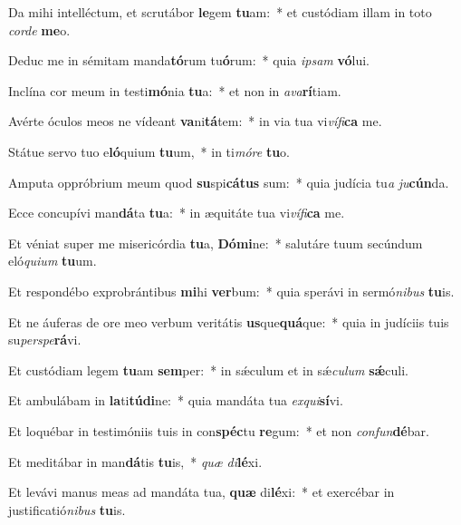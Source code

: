 \item Da mihi intelléctum, et scrutábor \textbf{le}gem \textbf{tu}am:~* et custódiam illam in toto \textit{cor}\textit{de} \textbf{me}o.
\item Deduc me in sémitam manda\textbf{tó}rum tu\textbf{ó}rum:~* quia \textit{ip}\textit{sam} \textbf{vó}lui.
\item Inclína cor meum in testi\textbf{mó}nia \textbf{tu}a:~* et non in \textit{a}\textit{va}\textbf{rí}tiam.
\item Avérte óculos meos ne vídeant \textbf{va}ni\textbf{tá}tem:~* in via tua vi\textit{ví}\textit{fi}\textbf{ca} me.
\item Státue servo tuo e\textbf{ló}quium \textbf{tu}um,~* in ti\textit{mó}\textit{re} \textbf{tu}o.
\item Amputa oppróbrium meum quod \textbf{su}spi\textbf{cá}\textbf{tus} sum:~* quia judícia tu\textit{a} \textit{ju}\textbf{cún}da.
\item Ecce concupívi man\textbf{dá}ta \textbf{tu}a:~* in æquitáte tua vi\textit{ví}\textit{fi}\textbf{ca} me.
\item Et véniat super me misericórdia \textbf{tu}a, \textbf{Dó}\textbf{mi}ne:~* salutáre tuum secúndum eló\textit{qui}\textit{um} \textbf{tu}um.
\item Et respondébo exprobrántibus \textbf{mi}hi \textbf{ver}bum:~* quia sperávi in sermó\textit{ni}\textit{bus} \textbf{tu}is.
\item Et ne áuferas de ore meo verbum veritátis \textbf{us}que\textbf{quá}que:~* quia in judíciis tuis su\textit{per}\textit{spe}\textbf{rá}vi.
\item Et custódiam legem \textbf{tu}am \textbf{sem}per:~* in sǽculum et in sǽ\textit{cu}\textit{lum} \textbf{sǽ}culi.
\item Et ambulábam in \textbf{la}ti\textbf{tú}\textbf{di}ne:~* quia mandáta tua \textit{ex}\textit{qui}\textbf{sí}vi.
\item Et loquébar in testimóniis tuis in con\textbf{spéc}tu \textbf{re}gum:~* et non \textit{con}\textit{fun}\textbf{dé}bar.
\item Et meditábar in man\textbf{dá}tis \textbf{tu}is,~* \textit{quæ} \textit{di}\textbf{lé}xi.
\item Et levávi manus meas ad mandáta tua, \textbf{quæ} di\textbf{lé}xi:~* et exercébar in justificatió\textit{ni}\textit{bus} \textbf{tu}is.
